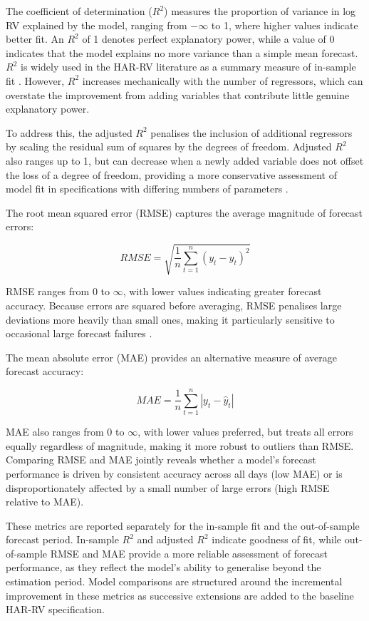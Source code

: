 \documentclass[12pt,a4paper]{report}
\begin{document}
The coefficient of determination ($R^2$) measures the proportion of variance in log RV explained by the model, ranging from $-\infty$ to 1, where higher values indicate better fit. An $R^2$ of 1 denotes perfect explanatory power, while a value of 0 indicates that the model explains no more variance than a simple mean forecast. $R^2$ is widely used in the HAR-RV literature as a summary measure of in-sample fit \citep{Corsi2009}. However, $R^2$ increases mechanically with the number of regressors, which can overstate the improvement from adding variables that contribute little genuine explanatory power.

To address this, the adjusted $R^2$ penalises the inclusion of additional regressors by scaling the residual sum of squares by the degrees of freedom. Adjusted $R^2$ also ranges up to 1, but can decrease when a newly added variable does not offset the loss of a degree of freedom, providing a more conservative assessment of model fit in specifications with differing numbers of parameters \citep{InoueKilian2005}.

The root mean squared error (RMSE) captures the average magnitude of forecast errors:

\begin{equation}
RMSE = \sqrt{\frac{1}{n} \sum_{t=1}^{n} (y_t - \hat{y}_t)^2}
\end{equation}

\noindent RMSE ranges from 0 to $\infty$, with lower values indicating greater forecast accuracy. Because errors are squared before averaging, RMSE penalises large deviations more heavily than small ones, making it particularly sensitive to occasional large forecast failures \citep{Patton2015}.

The mean absolute error (MAE) provides an alternative measure of average forecast accuracy:

\begin{equation}
MAE = \frac{1}{n} \sum_{t=1}^{n} |y_t - \hat{y}_t|
\end{equation}

\noindent MAE also ranges from 0 to $\infty$, with lower values preferred, but treats all errors equally regardless of magnitude, making it more robust to outliers than RMSE. Comparing RMSE and MAE jointly reveals whether a model's forecast performance is driven by consistent accuracy across all days (low MAE) or is disproportionately affected by a small number of large errors (high RMSE relative to MAE).

These metrics are reported separately for the in-sample fit and the out-of-sample forecast period. In-sample $R^2$ and adjusted $R^2$ indicate goodness of fit, while out-of-sample RMSE and MAE provide a more reliable assessment of forecast performance, as they reflect the model's ability to generalise beyond the estimation period. Model comparisons are structured around the incremental improvement in these metrics as successive extensions are added to the baseline HAR-RV specification.
\end{document}
